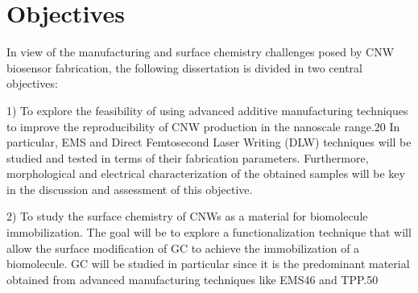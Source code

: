 
\chapter{Objectives} %

\label{Chapter:Objectives}






In view of the manufacturing and surface chemistry challenges posed by CNW biosensor
fabrication, the following dissertation is divided in two central objectives:

1) To explore the feasibility of using advanced additive manufacturing techniques to improve the reproducibility of CNW production in the nanoscale range.20 In particular, EMS and Direct Femtosecond Laser Writing (DLW) techniques will be studied and tested in terms of their fabrication parameters. Furthermore, morphological and electrical characterization of the obtained samples will be key in the discussion and assessment of this objective.

2) To study the surface chemistry of CNWs as a material for biomolecule immobilization. The goal will be to explore a functionalization technique that will allow the surface modification of GC to achieve the immobilization of a biomolecule. GC will be studied in particular since it is the predominant material obtained from advanced manufacturing techniques like EMS46 and TPP.50